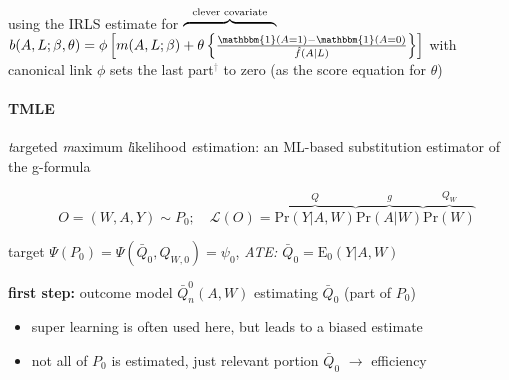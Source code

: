\documentclass[8pt,twoside]{extarticle}
\begin{document}
\begin{multicols}{2}
\begin{mdframed}[style=MyFrame,nobreak=true, innerleftmargin=2pt, innerrightmargin=2pt]
\noindent using the IRLS estimate for \hspace{2em} $\overbrace{ \hspace{6.7em} }^{\text{clever covariate}}$ \newline
 $b(A,L;\beta,\theta)=\phi\left[m(A,L;\beta) + \theta\left\{\frac{\mathbbm{1}(A{=}1)-\mathbbm{1}(A{=}0)}{\hat{f}(A|L)}\right\}\right]$ with canonical link $\phi$ sets the last part\textcolor{gray}{$^\dagger$} to zero (as the score equation for $\theta$)
\end{mdframed}




\paragraph{TMLE} \citep{van2006targeted, van2011targeted} \textit{t}argeted \textit{m}aximum \textit{l}ikelihood \textit{e}stimation:  an ML-based substitution estimator of the g-formula
\vspace{-2.5em}

$$\hspace{1em} O=(W, A, Y) \sim P_0; \hspace{1em} \mathcal{L}(O) = \overbrace{\mathrm{Pr}(Y|A, W)}^{Q}\overbrace{\mathrm{Pr}(A|W)}^{g}\overbrace{\mathrm{Pr}(W)}^{Q_W}$$

\noindent target $\Psi(P_0) = \Psi(\bar{Q}_0, Q_{W,0}) = \psi_0$, 
\textit{ATE: $\bar{Q}_0 = \mathrm{E}_0(Y|A,W)$} %

\noindent \textbf{first step:} outcome model $\bar{Q}^0_n(A,W)$ estimating $\bar{Q}_0$ (part of $P_0$)
\begin{itemize}[leftmargin=*, itemsep=0em, topsep=0pt, partopsep=0pt,parsep=0pt]
\setlength{\itemsep}{0pt}%
\setlength{\parskip}{0pt}
\item  super learning is often used here, but leads to a biased estimate
\item not all of $P_0$ is estimated, just relevant portion  $\bar{Q}_0$ $\rightarrow$ efficiency 
\end{itemize}


\end{multicols}
\end{document}
